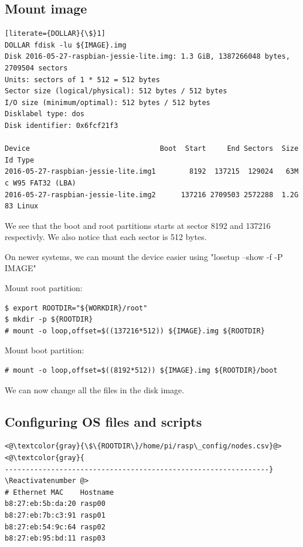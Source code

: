 \subsection{Mount image}

\begin{lstlisting}[literate={DOLLAR}{\$}1]
DOLLAR fdisk -lu ${IMAGE}.img
Disk 2016-05-27-raspbian-jessie-lite.img: 1.3 GiB, 1387266048 bytes, 2709504 sectors
Units: sectors of 1 * 512 = 512 bytes
Sector size (logical/physical): 512 bytes / 512 bytes
I/O size (minimum/optimal): 512 bytes / 512 bytes
Disklabel type: dos
Disk identifier: 0x6fcf21f3

Device                               Boot  Start     End Sectors  Size Id Type
2016-05-27-raspbian-jessie-lite.img1        8192  137215  129024   63M  c W95 FAT32 (LBA)
2016-05-27-raspbian-jessie-lite.img2      137216 2709503 2572288  1.2G 83 Linux
\end{lstlisting}
\FloatBarrier

We see that the boot and root partitions starts at sector 8192 and 137216 respectivly.
We also notice that each sector is 512 bytes.


On newer systems, we can mount the device easier using "losetup --show -f -P IMAGE"

Mount root partition:

\begin{lstlisting}[]
$ export ROOTDIR="${WORKDIR}/root"
$ mkdir -p ${ROOTDIR}
# mount -o loop,offset=$((137216*512)) ${IMAGE}.img ${ROOTDIR}
\end{lstlisting}
\FloatBarrier

Mount boot partition:
\begin{lstlisting}[]
# mount -o loop,offset=$((8192*512)) ${IMAGE}.img ${ROOTDIR}/boot
\end{lstlisting}
\FloatBarrier

We can now change all the files in the disk image.



\subsection{Configuring OS files and scripts}


\Suppressnumber\begin{lstlisting}[]
<@\textcolor{gray}{\$\{ROOTDIR\}/home/pi/rasp\_config/nodes.csv}@>
<@\textcolor{gray}{
---------------------------------------------------------------}
\Reactivatenumber @>
# Ethernet MAC    Hostname
b8:27:eb:5b:da:20 rasp00
b8:27:eb:7b:c3:91 rasp01
b8:27:eb:54:9c:64 rasp02
b8:27:eb:95:bd:11 rasp03
\end{lstlisting}
\FloatBarrier


